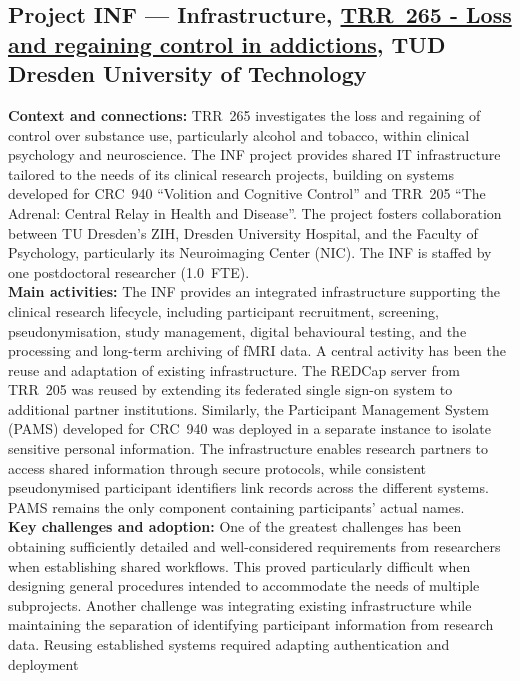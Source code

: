 \documentclass{eceasst}
\begin{document}
\subsection{Project INF --- Infrastructure, \href{https://gepris.dfg.de/gepris/projekt/402170461?language=en}{TRR~265 - Loss and regaining control in addictions}, TUD Dresden University of Technology}
\label{subsec:trr265}
\noindent\textbf{Context and connections:}
TRR~265 investigates the loss and regaining of control
over substance use, particularly alcohol and tobacco,
within clinical psychology and neuroscience.
The INF project provides shared IT infrastructure
tailored to the needs of its clinical research projects,
building on systems developed for CRC~940
``Volition and Cognitive Control'' and TRR~205
``The Adrenal: Central Relay in Health and Disease''.
The project fosters collaboration between TU Dresden's
ZIH, Dresden University Hospital, and
the Faculty of Psychology, particularly its
Neuroimaging Center (NIC).
The INF is staffed by one postdoctoral
researcher (1.0~FTE).
\\
\noindent\textbf{Main activities:}
The INF provides an integrated infrastructure
supporting the clinical research lifecycle,
including participant recruitment, screening,
pseudonymisation, study management, digital
behavioural testing, and the processing and
long-term archiving of fMRI data.
A central activity has been the reuse and adaptation
of existing infrastructure. The REDCap server from
TRR~205 was reused by extending its federated
single sign-on system to additional partner
institutions. Similarly, the Participant Management
System (PAMS) developed for CRC~940 was deployed
in a separate instance to isolate sensitive
personal information.
The infrastructure enables research partners
to access shared information through secure
protocols, while consistent pseudonymised
participant identifiers link records across
the different systems. PAMS remains the only
component containing participants' actual names.
\\
\noindent\textbf{Key challenges and adoption:}
One of the greatest challenges has been obtaining
sufficiently detailed and well-considered
requirements from researchers when establishing
shared workflows. This proved particularly
difficult when designing general procedures
intended to accommodate the needs of multiple
subprojects.
Another challenge was integrating existing
infrastructure while maintaining the separation
of identifying participant information from
research data. Reusing established systems
required adapting authentication and deployment
\end{document}
